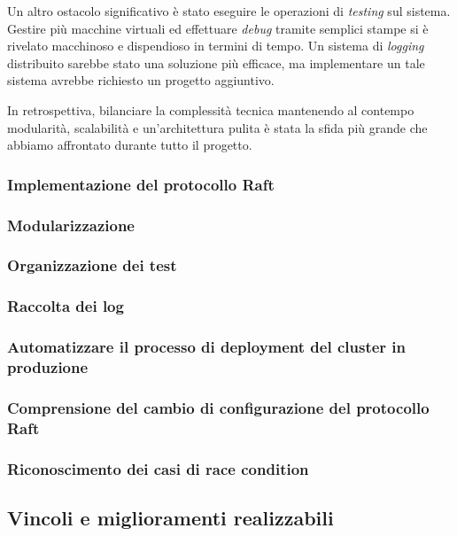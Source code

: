 Un altro ostacolo significativo è stato eseguire le operazioni di \textit{testing} sul sistema. Gestire più 
macchine virtuali ed effettuare \textit{debug} tramite semplici stampe  
si è rivelato macchinoso e dispendioso in termini di tempo. Un sistema di \textit{logging} distribuito sarebbe 
stato una 
soluzione più efficace, ma implementare un tale sistema avrebbe richiesto un progetto aggiuntivo.

In retrospettiva, bilanciare la complessità tecnica mantenendo al contempo modularità, scalabilità e 
un'architettura pulita è stata la sfida più grande che abbiamo affrontato durante tutto il progetto.
\subsubsection{Implementazione del protocollo Raft}
\subsubsection{Modularizzazione}



\subsubsection{Organizzazione dei test}

\subsubsection{Raccolta dei log}

\subsubsection{Automatizzare il processo di deployment del cluster in produzione}

\subsubsection{Comprensione del cambio di configurazione del protocollo Raft}

\subsubsection{Riconoscimento dei casi di race condition}

\subsection{Vincoli e miglioramenti realizzabili}
